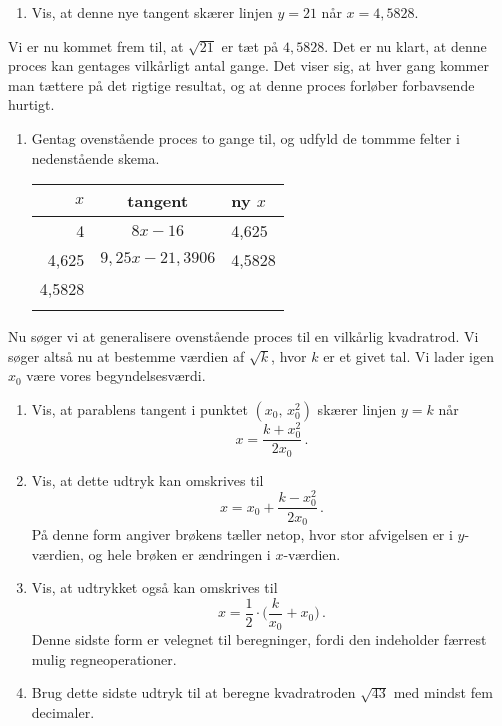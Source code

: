 \documentclass[12pt,oneside,a4paper]{article}
\theoremstyle{plain}
\begin{document}
\begin{enumerate}[label=(\alph*), resume]
    \item Vis, at denne nye tangent skærer linjen $y=21$ når $x=4,5828$.
\end{enumerate}

Vi er nu kommet frem til, at $\sqrt{21}$ er tæt på $4,5828$.
Det er nu klart, at denne proces kan gentages vilkårligt antal gange.
Det viser sig, at hver gang kommer man tættere på det rigtige resultat, og
at denne proces forløber forbavsende hurtigt.

\begin{enumerate}[label=(\alph*), resume]
    \item Gentag ovenstående proces to gange til, og udfyld de tommme felter i
        nedenstående skema.
        \begin{center}
            \begin{tabular}{|r|c|l|}
\hline
                $x$ & tangent & ny $x$ \\
                \hline
                4 & $8x-16$ & 4,625 \\
                \hline
                4,625 & $9,25x-21,3906$ & 4,5828 \\
                \hline
                4,5828 & & \\
                \hline
                 & & \\
                \hline
            \end{tabular}
        \end{center}
\end{enumerate}

Nu søger vi at generalisere ovenstående proces til en vilkårlig 
kvadratrod. Vi søger altså nu at bestemme værdien af $\sqrt{k}$, hvor
$k$ er et givet tal. Vi lader igen $x_0$ være vores begyndelsesværdi.

\begin{enumerate}[label=(\alph*), resume]
    \item Vis, at parablens tangent i punktet $(x_0,\,x_0^2)$ 
        skærer linjen $y=k$ når
        \[
            x = \frac{k+x_0^2}{2x_0}\,.
        \]
    \item Vis, at dette udtryk kan omskrives til 
        \[
            x = x_0 + \frac{k-x_0^2}{2x_0}\,.
        \]
    På denne form angiver brøkens tæller netop, hvor stor afvigelsen er i $y$-værdien,
        og hele brøken er ændringen i $x$-værdien.
    \item Vis, at udtrykket også kan omskrives til
        \[
            x = \frac12 \cdot \Big(\frac{k}{x_0} + x_0\Big) \,.
        \]
    Denne sidste form er velegnet til beregninger, fordi den indeholder færrest
        mulig regneoperationer.

    \item Brug dette sidste udtryk til at beregne kvadratroden $\sqrt{43}$ med
        mindst fem decimaler.
\end{enumerate}
\end{document}
